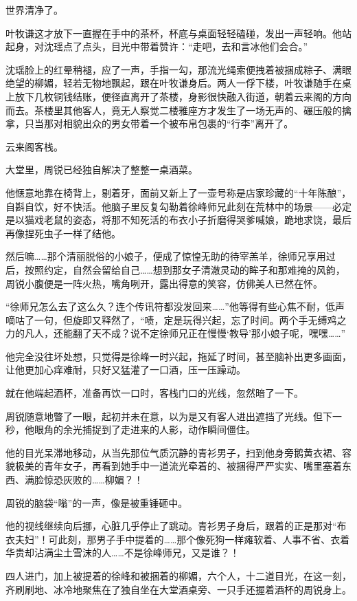 世界清净了。

叶牧谦这才放下一直握在手中的茶杯，杯底与桌面轻轻磕碰，发出一声轻响。他站起身，对沈瑶点了点头，目光中带着赞许：“走吧，去和言冰他们会合。”

沈瑶脸上的红晕稍褪，应了一声，手指一勾，那流光绳索便拽着被捆成粽子、满眼绝望的柳媚，轻若无物地飘起，跟在叶牧谦身后。两人一俘下楼，叶牧谦随手在桌上放下几枚铜钱结账，便径直离开了茶楼，身影很快融入街道，朝着云来阁的方向而去。茶楼里其他客人，竟无人察觉二楼雅座方才发生了一场无声的、碾压般的擒拿，只当那对相貌出众的男女带着一个被布帛包裹的“行李”离开了。

\vspace{2em}

云来阁客栈。

大堂里，周锐已经独自解决了整整一桌酒菜。

他惬意地靠在椅背上，剔着牙，面前又新上了一壶号称是店家珍藏的“十年陈酿”，自斟自饮，好不快活。他脑子里反复勾勒着徐峰师兄此刻在荒林中的场景——必定是以猫戏老鼠的姿态，将那不知死活的布衣小子折磨得哭爹喊娘，跪地求饶，最后再像捏死虫子一样了结他。

然后嘛……那个清丽脱俗的小娘子，便成了惊惶无助的待宰羔羊，徐师兄享用过后，按照约定，自然会留给自己……想到那女子清澈灵动的眸子和那难掩的风韵，周锐小腹便是一阵火热，嘴角咧开，露出得意的笑容，仿佛美人已然在怀。

“徐师兄怎么去了这么久？连个传讯符都没发回来……”他等得有些心焦不耐，低声嘀咕了一句，但旋即又释然了，“啧，定是玩得兴起，忘了时间。两个手无缚鸡之力的凡人，还能翻了天不成？说不定徐师兄正在慢慢‘教导’那小娘子呢，嘿嘿……”

他完全没往坏处想，只觉得是徐峰一时兴起，拖延了时间，甚至脑补出更多画面，让他更加心痒难耐，只好又猛灌了一口酒，压一压躁动。

就在他端起酒杯，准备再饮一口时，客栈门口的光线，忽然暗了一下。

周锐随意地瞥了一眼，起初并未在意，以为是又有客人进出遮挡了光线。但下一秒，他眼角的余光捕捉到了走进来的人影，动作瞬间僵住。

他的目光呆滞地移动，从当先那位气质沉静的青衫男子，扫到他身旁鹅黄衣裙、容貌极美的青年女子，再看到她手中一道流光牵着的、被捆得严严实实、嘴里塞着东西、满脸惊恐灰败的……柳媚？！

周锐的脑袋“嗡”的一声，像是被重锤砸中。

他的视线继续向后挪，心脏几乎停止了跳动。青衫男子身后，跟着的正是那对“布衣夫妇”！可此刻，那男子手中提着的……那个像死狗一样瘫软着、人事不省、衣着华贵却沾满尘土雪沫的人……不是徐峰师兄，又是谁？！

四人进门，加上被提着的徐峰和被捆着的柳媚，六个人，十二道目光，在这一刻，齐刷刷地、冰冷地聚焦在了独自坐在大堂酒桌旁、一只手还握着酒杯的周锐身上。

